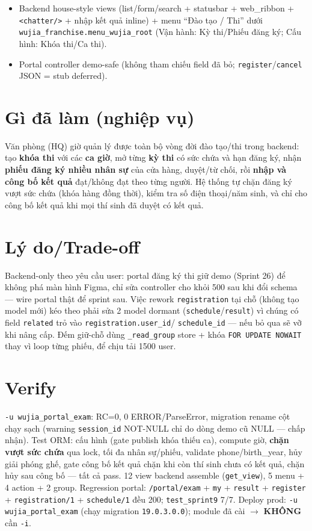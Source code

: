 \begin{itemize}
    category \texttt{wujia\_franchise.module\_category\_wujia}); ACL 5 model portal read-only + user/manager;
    record rule portal own-franchise (read-only).
  \item Backend house-style views (list/form/search + statusbar + web\_ribbon + \texttt{<chatter/>} +
    nhập kết quả inline) + menu ``Đào tạo / Thi'' dưới \texttt{wujia\_franchise.menu\_wujia\_root}
    (Vận hành: Kỳ thi/Phiếu đăng ký; Cấu hình: Khóa thi/Ca thi).
  \item Portal controller demo-safe (không tham chiếu field đã bỏ; \texttt{register}/\texttt{cancel} JSON
    = stub deferred).
\end{itemize}

\section{Gì đã làm (nghiệp vụ)}

Văn phòng (HQ) giờ quản lý được toàn bộ vòng đời đào tạo/thi trong backend: tạo \textbf{khóa thi} với các
\textbf{ca giờ}, mở từng \textbf{kỳ thi} có sức chứa và hạn đăng ký, nhận \textbf{phiếu đăng ký nhiều nhân sự}
của cửa hàng, duyệt/từ chối, rồi \textbf{nhập và công bố kết quả} đạt/không đạt theo từng người. Hệ thống tự
chặn đăng ký vượt sức chứa (khóa hàng đồng thời), kiểm tra số điện thoại/năm sinh, và chỉ cho công bố kết
quả khi mọi thí sinh đã duyệt có kết quả.

\section{Lý do/Trade-off}

Backend-only theo yêu cầu user: portal đăng ký thi giữ demo (Sprint 26) để không phá màn hình Figma, chỉ
sửa controller cho khỏi 500 sau khi đổi schema --- wire portal thật để sprint sau. Việc rework
\texttt{registration} tại chỗ (không tạo model mới) kéo theo phải sửa 2 model dormant
(\texttt{schedule}/\texttt{result}) vì chúng có field \texttt{related} trỏ vào \texttt{registration.user\_id}/
\texttt{schedule\_id} --- nếu bỏ qua sẽ vỡ khi nâng cấp. Đếm giữ-chỗ dùng \texttt{\_read\_group} store +
khóa \texttt{FOR UPDATE NOWAIT} thay vì loop từng phiếu, để chịu tải 1500 user.

\section{Verify}

\texttt{-u wujia\_portal\_exam}: RC=0, 0 ERROR/ParseError, migration rename cột chạy sạch (warning
\texttt{session\_id} NOT-NULL chỉ do dòng demo cũ NULL --- chấp nhận). Test ORM: cấu hình (gate publish
khóa thiếu ca), compute giờ, \textbf{chặn vượt sức chứa} qua lock, tối đa nhân sự/phiếu, validate
phone/birth\_year, hủy giải phóng ghế, gate công bố kết quả chặn khi còn thí sinh chưa có kết quả, chặn hủy
sau công bố --- tất cả pass. 12 view backend assemble (\texttt{get\_view}), 5 menu + 4 action + 2 group.
Regression portal: \texttt{/portal/exam} + \texttt{my} + \texttt{result} + \texttt{register} +
\texttt{registration/1} + \texttt{schedule/1} đều 200; \texttt{test\_sprint9} 7/7. Deploy prod:
\texttt{-u wujia\_portal\_exam} (chạy migration \texttt{19.0.3.0.0}); module đã cài $\to$ \textbf{KHÔNG} cần \texttt{-i}.
